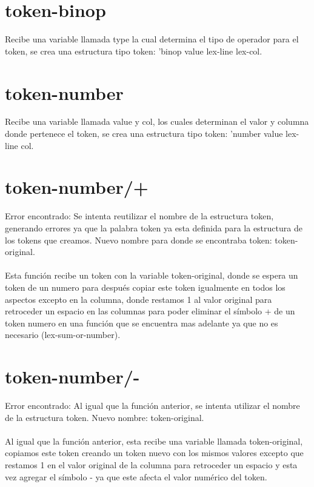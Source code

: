 \documentclass{article}
\begin{document}
\section{token-binop}

Recibe una variable llamada type la cual determina el tipo de operador para el token, se crea una estructura tipo token: 'binop value lex-line lex-col.

\section{token-number}

Recibe una variable llamada value y col, los cuales determinan el valor y columna donde pertenece el token, se crea una estructura tipo token: 'number value lex-line col.

\section{token-number/+}

Error encontrado: Se intenta reutilizar el nombre de la estructura token, generando errores ya que la palabra token ya esta definida para la estructura de los tokens que creamos. Nuevo nombre para donde se encontraba token: token-original.
\\
\\
Esta función recibe un token con la variable token-original, donde se espera un token de un numero para después copiar este token igualmente en todos los aspectos excepto en la columna, donde restamos 1 al valor original para retroceder un espacio en las columnas para poder eliminar el símbolo + de un token numero en una función que se encuentra mas adelante ya que no es necesario (lex-sum-or-number).

\section{token-number/-}

Error encontrado: Al igual que la función anterior, se intenta utilizar el nombre de la estructura token. Nuevo nombre: token-original.
\\
\\
Al igual que la función anterior, esta recibe una variable llamada token-original, copiamos este token creando un token nuevo con los mismos valores excepto que restamos 1 en el valor original de la columna para retroceder un espacio y esta vez agregar el símbolo - ya que este afecta el valor numérico del token.
\end{document}
